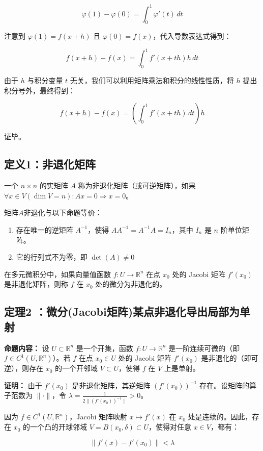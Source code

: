 \documentclass[12pt,a4paper]{ctexart}
\begin{document}
\[
\varphi(1) - \varphi(0) = \int_0^1 \varphi'(t) \, dt
\]

注意到 $\varphi(1) = f(x+h)$ 且 $\varphi(0) = f(x)$，代入导数表达式得到：

\[
f(x+h) - f(x) = \int_0^1 f'(x+th)h \, dt
\]

由于 $h$ 与积分变量 $t$ 无关，我们可以利用矩阵乘法和积分的线性性质，将 $h$ 提出积分号外，最终得到：

\[
f(x+h) - f(x) = \left( \int_0^1 f'(x+th) \, dt \right) h
\]

证毕。

\subsection*{定义1：非退化矩阵}
一个 $n \times n$ 的实矩阵 $A$ 称为非退化矩阵（或可逆矩阵），如果$\forall x\in V(\dim V=n):Ax=0 \Rightarrow x=0$。

矩阵$A$非退化与以下命题等价：
\begin{enumerate}[label=\arabic*.,leftmargin=2.5em]
\item 存在唯一的逆矩阵 $A^{-1}$，使得 $A A^{-1} = A^{-1} A = I_n$，其中 $I_n$ 是 $n$ 阶单位矩阵。
\item 它的行列式不为零，即 $\det(A) \neq 0$
\end{enumerate}

在多元微积分中，如果向量值函数 $f: U \to \mathbb{R}^n$ 在点 $x_0$ 处的 Jacobi 矩阵 $f'(x_0)$ 是非退化矩阵，则称 $f$ 在 $x_0$ 处的微分为非退化的。

\subsection*{定理2 ：微分(Jacobi矩阵)某点非退化导出局部为单射}

\textbf{命题内容：}
设 $U \subset \mathbb{R}^n$ 是一个开集，函数 $f: U \to \mathbb{R}^n$ 是一阶连续可微的（即 $f \in C^1(U, \mathbb{R}^n)$）。若 $f$ 在点 $x_0 \in U$ 处的 Jacobi 矩阵 $f'(x_0)$ 是非退化的（即可逆），则存在 $x_0$ 的一个开邻域 $V \subset U$，使得 $f$ 在 $V$ 上是单射。

\textbf{证明：}
由于 $f'(x_0)$ 是非退化矩阵，其逆矩阵 $(f'(x_0))^{-1}$ 存在。设矩阵的算子范数为 $\|\cdot\|$，令 $\lambda = \frac{1}{2 \| (f'(x_0))^{-1} \|} > 0$。

因为 $f \in C^1(U, \mathbb{R}^n)$，Jacobi 矩阵映射 $x \mapsto f'(x)$ 在 $x_0$ 处是连续的。因此，存在 $x_0$ 的一个凸的开球邻域 $V = B(x_0, \delta) \subset U$，使得对任意 $x \in V$，都有：

\[
\| f'(x) - f'(x_0) \| < \lambda
\]
\end{document}
